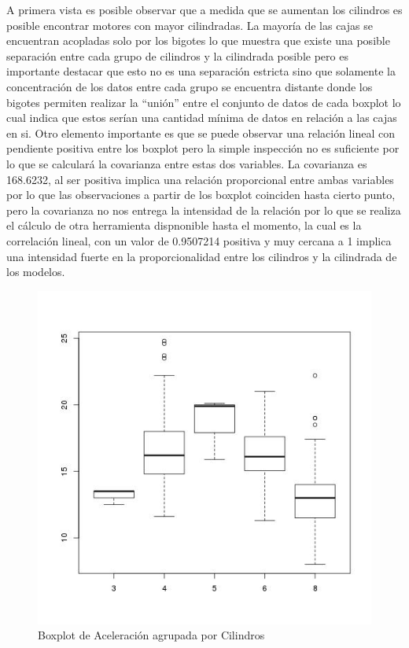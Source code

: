 \documentclass[letter,10pt]{article}
\begin{document}
A primera vista es posible observar que a medida que se aumentan los cilindros es posible
encontrar motores con mayor cilindradas. La mayoría de las cajas se encuentran acopladas solo por los bigotes lo que muestra
que existe una posible separación entre cada grupo de cilindros y la cilindrada posible pero es importante destacar que esto
no es una separación estricta sino que solamente la concentración de los datos entre cada grupo se encuentra distante donde los bigotes
permiten realizar la ``unión'' entre el conjunto de datos de cada boxplot lo cual indica que estos serían una cantidad mínima
de datos en relación a las cajas en si.
Otro elemento importante es que se puede observar una relación lineal con pendiente positiva entre los boxplot pero
la simple inspección no es suficiente por lo que se calculará la covarianza entre estas dos variables. La covarianza es
168.6232, al ser positiva implica una relación proporcional entre ambas variables por lo que las observaciones a partir
de los boxplot coinciden hasta cierto punto, pero la covarianza no nos entrega la intensidad de la relación por lo que se realiza
el cálculo de otra herramienta dispnonible hasta el momento, la cual es la correlación lineal, con un valor de 0.9507214
positiva y muy cercana a 1 implica una intensidad fuerte en la proporcionalidad entre los cilindros y la cilindrada de los modelos.
\begin{figure}[h!]
    \centering
    \includegraphics[scale=0.4]{boxplot_acceleration_cylinders.jpg}
    \caption{Boxplot de Aceleración agrupada por Cilindros}
    \label{fig:boxplot_horsepower_cylinders}
\end{figure}
\end{document}
